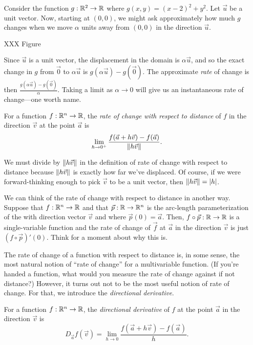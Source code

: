 Consider the function $g:\mathbb{R}^2\to\mathbb{R}$ where $g(x,y)=(x-2)^2+y^2$.  Let $\vec u$ be a unit
vector.  Now, starting at $(0,0)$, we might ask approximately how much $g$ changes
when we move $\alpha$ units away from $(0,0)$ in the direction $\vec u$.

XXX Figure

Since $\vec u$ is a unit vector, the displacement in the domain is $\alpha\vec u$, and so the
exact change in $g$ from $\vec 0$ to $\alpha\vec u$ is $g(\alpha\vec u)-g(\vec 0)$.  The approximate
\emph{rate} of change is then $\frac{g(\alpha\vec u)-g(\vec 0)}{\alpha}$.  Taking
a limit as $\alpha\to 0$ will give us an instantaneous rate of change---one worth name.

\begin{definition}
	For a function $f:\mathbb{R}^n\to\mathbb{R}$, the \emph{rate of change with respect to distance} of $f$
	in the direction $\vec v$ at the point $\vec a$ is
	\[
		\lim_{h\to 0^+}\frac{f(\vec a+h\vec v)-f(\vec a)}{\lVert h\vec v\rVert}.
	\]
\end{definition}

We must divide by $\lVert h\vec v\rVert$ in the definition of rate of change with respect to distance
because $\lVert h\vec v\rVert$ is exactly how far we've displaced.  Of course, if we were forward-thinking
enough to pick $\vec v$ to be a unit vector, then $\lVert h\vec v\rVert=\lvert h\rvert$.

We can think of the rate of change with respect to distance in another way.  Suppose that $f:\mathbb{R}^n\to \mathbb{R}$
and that $\vec p:\mathbb{R}\to\mathbb{R}^n$ is the arc-length parameterization of the with direction
vector $\vec v$ and where $\vec p(0)=\vec a$.  Then, $f\circ \vec p:\mathbb{R}\to\mathbb{R}$ is a single-variable
function and the rate of change of $\vec f$ at $\vec a$ in the direction $\vec v$ is just $(f\circ\vec p)'(0)$.
Think for a moment about why this is.

The rate of change of a function with respect to distance is, in some sense, the most natural
notion of ``rate of change'' for a multivariable function.  (If you're handed a function, what
would you measure the rate of change against if not distance?)  However, it turns out not
to be the most useful notion of rate of change.  For that, we introduce the 
\emph{directional derivative}.

\begin{definition}
	For a function $f:\mathbb{R}^n\to\mathbb{R}$, the \emph{directional derivative} of $f$ at the point $\vec a$
	in the direction $\vec v$ is
	\[
		D_{\vec a}f(\vec v) = \lim_{h\to0}\frac{f(\vec a+h\vec v)-f(\vec a)}{h}.
	\]
\end{definition}

